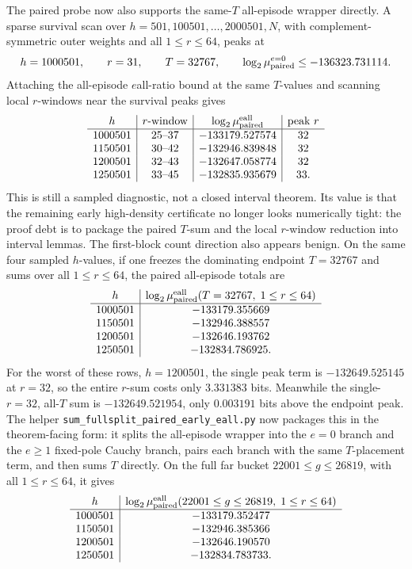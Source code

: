 The paired probe now also supports the same-\(T\) all-episode wrapper directly.  A sparse survival scan over
\(h=501,100501,\ldots,2000501,N\), with complement-symmetric outer weights and all \(1\le r\le64\), peaks at
\[
h=1000501,\qquad r=31,\qquad T=32767,
\qquad
\log_2\mu^{e=0}_{\rm paired}\le -136323.731114.
\]
Attaching the all-episode \(e\)all-ratio bound at the same \(T\)-values and scanning local \(r\)-windows near the
survival peaks gives
\[
\begin{array}{c|c|c|c}
h & r\text{-window} & \log_2\mu_{\rm paired}^{\rm eall} & \text{peak }r\\
\hline
1000501 & 25\text{--}37 & -133179.527574 & 32\\
1150501 & 30\text{--}42 & -132946.839848 & 32\\
1200501 & 32\text{--}43 & -132647.058774 & 32\\
1250501 & 33\text{--}45 & -132835.935679 & 33 .
\end{array}
\]
This is still a sampled diagnostic, not a closed interval theorem.  Its value is that the remaining early
high-density certificate no longer looks numerically tight: the proof debt is to package the paired \(T\)-sum and the
local \(r\)-window reduction into interval lemmas.
The first-block count direction also appears benign.  On the same four sampled \(h\)-values, if one freezes the
dominating endpoint \(T=32767\) and sums over all \(1\le r\le64\), the paired all-episode totals are
\[
\begin{array}{c|c}
h & \log_2\mu_{\rm paired}^{\rm eall}(T=32767,\;1\le r\le64)\\
\hline
1000501 & -133179.355669\\
1150501 & -132946.388557\\
1200501 & -132646.193762\\
1250501 & -132834.786925 .
\end{array}
\]
For the worst of these rows, \(h=1200501\), the single peak term is \(-132649.525145\) at \(r=32\), so the entire
\(r\)-sum costs only \(3.331383\) bits.  Meanwhile the single-\(r=32\), all-\(T\) sum is
\(-132649.521954\), only \(0.003191\) bits above the endpoint peak.  The helper
\texttt{sum\_fullsplit\_paired\_early\_eall.py} now packages this in the theorem-facing form: it splits the
all-episode wrapper into the \(e=0\) branch and the \(e\ge1\) fixed-pole Cauchy branch, pairs each branch with the
same \(T\)-placement term, and then sums \(T\) directly.  On the full far bucket \(22001\le g\le26819\), with all
\(1\le r\le64\), it gives
\[
\begin{array}{c|c}
h & \log_2\mu_{\rm paired}^{\rm eall}(22001\le g\le26819,\;1\le r\le64)\\
\hline
1000501 & -133179.352477\\
1150501 & -132946.385366\\
1200501 & -132646.190570\\
1250501 & -132834.783733 .
\end{array}
\]
